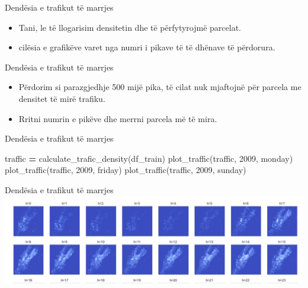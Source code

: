 \documentclass[
  ignorenonframetext,
]{beamer}
\newenvironment{Shaded}{\begin{snugshade}}{\end{snugshade}}
\newcommand{\DecValTok}[1]{\textcolor[rgb]{0.00,0.00,0.81}{#1}}
\newcommand{\NormalTok}[1]{#1}
\newcommand{\OperatorTok}[1]{\textcolor[rgb]{0.81,0.36,0.00}{\textbf{#1}}}
\newcommand{\StringTok}[1]{\textcolor[rgb]{0.31,0.60,0.02}{#1}}
\begin{document}
\begin{frame}{Dendësia e trafikut të marrjes}
\protect\hypertarget{denduxebsia-e-trafikut-tuxeb-marrjes-4}{}
\begin{itemize}
\item
  Tani, le të llogarisim densitetin dhe të përfytyrojmë parcelat.
\item
  cilësia e grafikëve varet nga numri i pikave të të dhënave të
  përdorura.
\end{itemize}
\end{frame}

\begin{frame}{Dendësia e trafikut të marrjes}
\protect\hypertarget{denduxebsia-e-trafikut-tuxeb-marrjes-5}{}
\begin{itemize}
\item
  Përdorim si parazgjedhje 500 mijë pika, të cilat nuk mjaftojnë për
  parcela me densitet të mirë trafiku.
\item
  Rritni numrin e pikëve dhe merrni parcela më të mira.
\end{itemize}
\end{frame}

\begin{frame}[fragile]{Dendësia e trafikut të marrjes}
\protect\hypertarget{denduxebsia-e-trafikut-tuxeb-marrjes-6}{}

\begin{Shaded}
\begin{Highlighting}[]
\NormalTok{traffic }\OperatorTok{=}\NormalTok{ calculate\_trafic\_density(df\_train)}
\NormalTok{plot\_traffic(traffic, }\DecValTok{2009}\NormalTok{, }\StringTok{\textquotesingle{}monday\textquotesingle{}}\NormalTok{)}
\NormalTok{plot\_traffic(traffic, }\DecValTok{2009}\NormalTok{, }\StringTok{\textquotesingle{}friday\textquotesingle{}}\NormalTok{)}
\NormalTok{plot\_traffic(traffic, }\DecValTok{2009}\NormalTok{, }\StringTok{\textquotesingle{}sunday\textquotesingle{}}\NormalTok{)}
\end{Highlighting}
\end{Shaded}
\end{frame}

\begin{frame}{Dendësia e trafikut të marrjes}
\protect\hypertarget{denduxebsia-e-trafikut-tuxeb-marrjes-7}{}
\includegraphics{./Figs/train19.png}
\end{frame}
\end{document}
